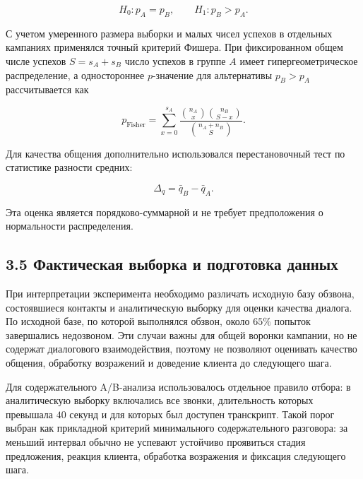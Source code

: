 \documentclass[a4paper,14pt]{extarticle}
\begin{document}
\begin{equation}
H_0: p_A = p_B,
\qquad
H_1: p_B > p_A.
\end{equation}

С учетом умеренного размера выборки и малых чисел успехов в отдельных
кампаниях применялся точный критерий Фишера. При фиксированном общем
числе успехов \(S = s_A + s_B\) число успехов в группе \(A\) имеет
гипергеометрическое распределение, а одностороннее \(p\)-значение для
альтернативы \(p_B > p_A\) рассчитывается как

\begin{equation}
p_{\mathrm{Fisher}} =
\sum_{x=0}^{s_A}
\frac{\binom{n_A}{x}\binom{n_B}{S-x}}
{\binom{n_A+n_B}{S}}.
\end{equation}

Для качества общения дополнительно использовался перестановочный тест по
статистике разности средних:

\begin{equation}
\Delta_q = \bar q_B - \bar q_A.
\end{equation}

Эта оценка является порядково-суммарной и не требует предположения о
нормальности распределения.

\subsection{3.5 Фактическая выборка и подготовка
данных}\label{ux444ux430ux43aux442ux438ux447ux435ux441ux43aux430ux44f-ux432ux44bux431ux43eux440ux43aux430-ux438-ux43fux43eux434ux433ux43eux442ux43eux432ux43aux430-ux434ux430ux43dux43dux44bux445}

При интерпретации эксперимента необходимо различать исходную базу
обзвона, состоявшиеся контакты и аналитическую выборку для оценки
качества диалога. По исходной базе, по которой выполнялся обзвон, около
\(65\%\) попыток завершались недозвоном. Эти случаи важны для общей
воронки кампании, но не содержат диалогового взаимодействия, поэтому не
позволяют оценивать качество общения, обработку возражений и доведение
клиента до следующего шага.

Для содержательного A/B-анализа использовалось отдельное правило отбора:
в аналитическую выборку включались все звонки, длительность которых
превышала \(40\) секунд и для которых был доступен транскрипт. Такой
порог выбран как прикладной критерий минимального содержательного
разговора: за меньший интервал обычно не успевают устойчиво проявиться
стадия предложения, реакция клиента, обработка возражения и фиксация
следующего шага.
\end{document}
